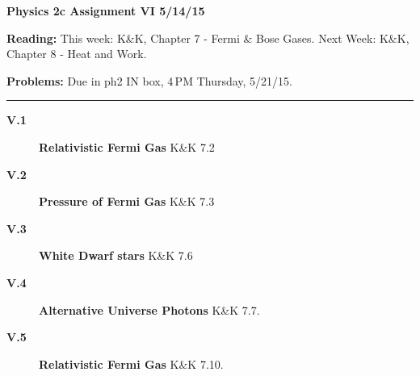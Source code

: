 \documentclass[11pt]{article}
\def\hb{\hfill\break}
\begin{document}
%
\centerline{\large\bf Physics 2c \hfill Assignment VI \hfill  5/14/15}

\medskip
\begin{list}{}{\leftmargin 2.4cm  .2cm }
\item[{\bf Reading:}  \hfill ] This week: K\&K, Chapter 7 - Fermi \& Bose Gases. \hb
                               Next Week:      K\&K, Chapter 8 - Heat and Work.
\item[{\bf Problems:} \hfill ] Due in ph2 IN box, 4\,PM  Thursday, 5/21/15.
\end{list}

\hrule

\begin{description}
\item[{\bf V.1}] {\bf Relativistic Fermi Gas} K\&K 7.2 \\

\item[{\bf V.2}] {\bf Pressure of Fermi Gas} K\&K 7.3 \\

\item[{\bf V.3}] {\bf White Dwarf stars} K\&K 7.6\\

\item[{\bf V.4}] {\bf Alternative Universe Photons} K\&K 7.7. \\

\item[{\bf V.5}] {\bf Relativistic Fermi Gas} K\&K 7.10.


\end{description}
\end{document}
